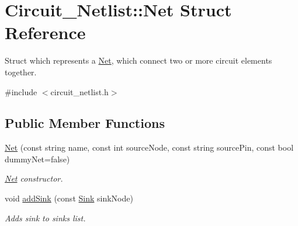 \hypertarget{structCircuit__Netlist_1_1Net}{\section{Circuit\-\_\-\-Netlist\-:\-:Net Struct Reference}
\label{structCircuit__Netlist_1_1Net}
}


Struct which represents a \hyperlink{structCircuit__Netlist_1_1Net}{Net}, which connect two or more circuit elements together.  




{\ttfamily \#include $<$circuit\-\_\-netlist.\-h$>$}

\subsection*{Public Member Functions}
\begin{DoxyCompactItemize}
\item 
\hyperlink{structCircuit__Netlist_1_1Net_acebd510f80cda6c9c480b5e313978895}{Net} (const string name, const int source\-Node, const string source\-Pin, const bool dummy\-Net=false)
\begin{DoxyCompactList}\small\item\em \hyperlink{structCircuit__Netlist_1_1Net}{Net} constructor. \end{DoxyCompactList}\item 
void \hyperlink{structCircuit__Netlist_1_1Net_af5bf832949516e3d7e16957206809027}{add\-Sink} (const \hyperlink{structCircuit__Netlist_1_1Sink}{Sink} sink\-Node)
\begin{DoxyCompactList}\small\item\em Adds sink to sinks list. \end{DoxyCompactList}\end{DoxyCompactItemize}
